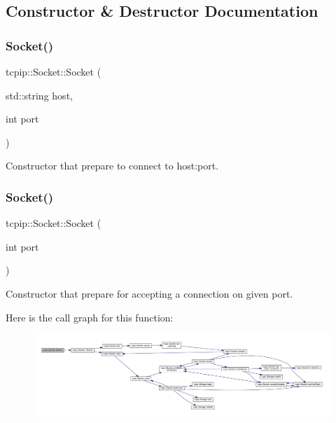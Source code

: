 \subsection{Constructor \& Destructor Documentation}
\mbox{\label{classtcpip_1_1_socket_adcf673cc4a6e4183f4a6f0929e13c5c1}} 
\subsubsection{\texorpdfstring{Socket()}{Socket()}\hspace{0.1cm}{\footnotesize\ttfamily [1/2]}}
{\footnotesize\ttfamily tcpip\+::\+Socket\+::\+Socket (\begin{DoxyParamCaption}\item[{std\+::string}]{host,  }\item[{int}]{port }\end{DoxyParamCaption})}



Constructor that prepare to connect to host\+:port. 

\mbox{\label{classtcpip_1_1_socket_af92b0e4bfc335b36971e94baa19fa017}} 
\subsubsection{\texorpdfstring{Socket()}{Socket()}\hspace{0.1cm}{\footnotesize\ttfamily [2/2]}}
{\footnotesize\ttfamily tcpip\+::\+Socket\+::\+Socket (\begin{DoxyParamCaption}\item[{int}]{port }\end{DoxyParamCaption})}



Constructor that prepare for accepting a connection on given port. 

Here is the call graph for this function\+:
\nopagebreak
\begin{figure}[H]
\begin{center}
\leavevmode
\includegraphics[width=350pt]{classtcpip_1_1_socket_af92b0e4bfc335b36971e94baa19fa017_cgraph}
\end{center}
\end{figure}
\mbox{\label{classtcpip_1_1_socket_a610c213f4b2fad07cc0bfddc3a5577e4}} 
